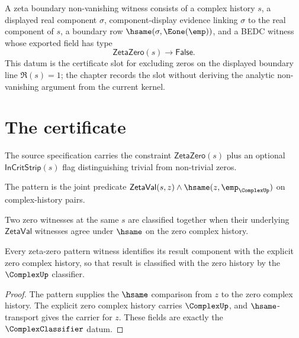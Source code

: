 \begin{definition}
\label{def:zeta-boundary-nonvanishing-witness}
A zeta boundary non-vanishing witness consists of a complex history $s$, a displayed real component $\sigma$, component-display evidence linking $\sigma$ to the real component of $s$, a boundary row $\hsame(\sigma,\Eone(\emp))$, and a BEDC witness whose exported field has type
$$
\mathsf{ZetaZero}(s)\to\mathsf{False}.
$$
This datum is the certificate slot for excluding zeros on the displayed boundary line $\Re(s)=1$; the chapter records the slot without deriving the analytic non-vanishing argument from the current kernel.
\end{definition}

\section{The certificate}

\begin{definition}
\label{def:zeta-zero-source-spec}
The source specification carries the constraint \(\mathsf{ZetaZero}(s)\) plus an optional \(\mathsf{InCritStrip}(s)\) flag distinguishing trivial from non-trivial zeros.
\end{definition}

\begin{definition}
\label{def:zeta-zero-pattern-spec}
The pattern is the joint predicate \(\mathsf{ZetaVal}(s, z) \wedge \hsame(z, \emp_{\ComplexUp})\) on complex-history pairs.
\end{definition}

\begin{definition}
\label{def:zeta-zero-classifier-spec}
Two zero witnesses at the same \(s\) are classified together when their underlying \(\mathsf{ZetaVal}\) witnesses agree under \(\hsame\) on the zero complex history.
\end{definition}

\begin{theorem}
\label{thm:zeta-zero-pattern-spec-zero-result-classifier}
Every zeta-zero pattern witness identifies its result component with the explicit zero
complex history, so that result is classified with the zero history by the
\(\ComplexUp\) classifier.
\end{theorem}
\begin{proof}
The pattern supplies the \(\hsame\) comparison from \(z\) to the zero complex
history. The explicit zero complex history carries \(\ComplexUp\), and
\(\hsame\)-transport gives the carrier for \(z\). These fields are exactly the
\(\ComplexClassifier\) datum.
\end{proof}

